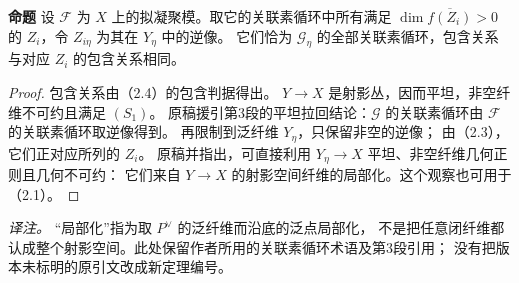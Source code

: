 \documentclass[openany,fontset=fandol]{ctexbook}
\newcommand{\FF}{\mathcal F}
\newcommand{\GG}{\mathcal G}
\newcommand{\tagitem}[2]{\par\medskip\noindent\textbf{#1\quad #2}\enspace}
\begin{document}
\tagitem{命题}{2.7}
设 \(\FF\) 为 \(X\) 上的拟凝聚模。取它的关联素循环中所有满足
\(\dim\overline{f(Z_i)}>0\) 的 \(Z_i\)，令 \(Z_{i\eta}\) 为其在 \(Y_\eta\) 中的逆像。
它们恰为 \(\GG_\eta\) 的全部关联素循环，包含关系与对应 \(Z_i\) 的包含关系相同。
\begin{proof}
包含关系由（2.4）的包含判据得出。
\(Y\to X\) 是射影丛，因而平坦，非空纤维不可约且满足 \((S_1)\)。
原稿援引第3段的平坦拉回结论：\(\GG\) 的关联素循环由 \(\FF\) 的关联素循环取逆像得到。
再限制到泛纤维 \(Y_\eta\)，只保留非空的逆像；
由（2.3），它们正对应所列的 \(Z_i\)。
原稿并指出，可直接利用 \(Y_\eta\to X\) 平坦、非空纤维几何正则且几何不可约：
它们来自 \(Y\to X\) 的射影空间纤维的局部化。这个观察也可用于（2.1）。
\end{proof}
\noindent\emph{译注。} “局部化”指为取 \(P^\vee\) 的泛纤维而沿底的泛点局部化，
不是把任意闭纤维都认成整个射影空间。此处保留作者所用的关联素循环术语及第3段引用；
没有把版本未标明的原引文改成新定理编号。
\end{document}
